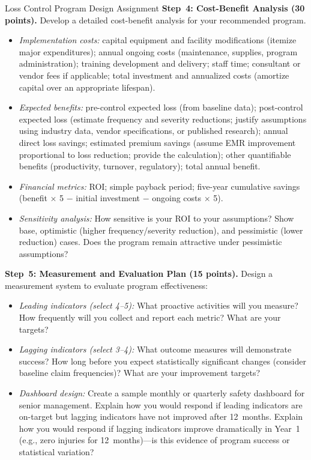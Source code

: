 \documentclass[11pt,openany]{book}
\providecommand{\tightlist}{\setlength{\itemsep}{0pt}\setlength{\parskip}{0pt}}
\begin{document}
\begin{minicase}{Loss Control Program Design Assignment}
\medskip
\textbf{Step~4: Cost-Benefit Analysis (30 points).} Develop a detailed
cost-benefit analysis for your recommended program.
\begin{itemize}\tightlist
  \item \emph{Implementation costs:} capital equipment and facility
        modifications (itemize major expenditures); annual ongoing costs
        (maintenance, supplies, program administration); training development
        and delivery; staff time; consultant or vendor fees if applicable;
        total investment and annualized costs (amortize capital over an
        appropriate lifespan).
  \item \emph{Expected benefits:} pre-control expected loss (from baseline
        data); post-control expected loss (estimate frequency and severity
        reductions; justify assumptions using industry data, vendor
        specifications, or published research); annual direct loss savings;
        estimated premium savings (assume EMR improvement proportional to loss
        reduction; provide the calculation); other quantifiable benefits
        (productivity, turnover, regulatory); total annual benefit.
  \item \emph{Financial metrics:} ROI; simple payback period; five-year
        cumulative savings (benefit \(\times\) 5 \(-\) initial investment
        \(-\) ongoing costs \(\times\) 5).
  \item \emph{Sensitivity analysis:} How sensitive is your ROI to your
        assumptions? Show base, optimistic (higher frequency/severity
        reduction), and pessimistic (lower reduction) cases. Does the program
        remain attractive under pessimistic assumptions?
\end{itemize}

\medskip
\textbf{Step~5: Measurement and Evaluation Plan (15 points).} Design a
measurement system to evaluate program effectiveness:
\begin{itemize}\tightlist
  \item \emph{Leading indicators (select 4--5):} What proactive activities
        will you measure? How frequently will you collect and report each
        metric? What are your targets?
  \item \emph{Lagging indicators (select 3--4):} What outcome measures will
        demonstrate success? How long before you expect statistically
        significant changes (consider baseline claim frequencies)? What are
        your improvement targets?
  \item \emph{Dashboard design:} Create a sample monthly or quarterly safety
        dashboard for senior management. Explain how you would respond if
        leading indicators are on-target but lagging indicators have not
        improved after 12~months. Explain how you would respond if lagging
        indicators improve dramatically in Year~1 (e.g., zero injuries for
        12~months)---is this evidence of program success or statistical
        variation?
\end{itemize}


\end{minicase}
\end{document}
